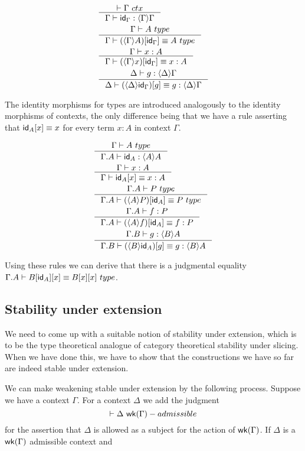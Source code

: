 \begin{align}
&\inference{\jctx{\Gamma}}{\jterm{\Gamma}{\ctxwk{\Gamma}{\Gamma}}{\idfunc[\Gamma]}}\label{ctxIdFuncForm}\\
&\inference{\jtype{\Gamma}{A}}{\jtypeeq{\Gamma}{\subst{\idfunc[\Gamma]}{\ctxwk{\Gamma}{A}}}{A}}\label{ctxIdFuncPbInvType}\\
&\inference{\jterm{\Gamma}{A}{x}}{\jtermeq{\Gamma}{A}{\subst{\idfunc[\Gamma]}{\ctxwk{\Gamma}{x}}}{x}}\label{ctxIdFuncPbInvTerm}\\
&\inference{\jterm{\Delta}{\ctxwk{\Delta}{\Gamma}}{g}}{\jtermeq{\Delta}{\ctxwk{\Delta}{\Gamma}}{\subst{g}{\ctxwk{\Delta}{\idfunc[\Gamma]}}}{g}}\label{ctxIdFuncSubstInvTerm}
\end{align}

The identity morphisms for types are introduced analogously to the identity
morphisms of contexts, the only difference being that we have a rule asserting
that $\subst{x}{\idfunc[A]}\jdeq x$ for every term $x:A$ in context $\Gamma$.

\begin{align}
& \inference{\jtype{\Gamma}{A}}{\jterm{\ctxext{\Gamma}{A}}{\ctxwk{A}{A}}{\idfunc[A]}}\\
& \inference{\jterm{\Gamma}{A}{x}}{\jtermeq{\Gamma}{A}{\subst{x}{\idfunc[A]}}{x}}\\
& \inference{\jtype{\ctxext{\Gamma}{A}}{P}}{\jtypeeq{\ctxext{\Gamma}{A}}{\subst{\idfunc[A]}{\ctxwk{A}{P}}}{P}}\\
& \inference{\jterm{\ctxext{\Gamma}{A}}{P}{f}}{\jtermeq{\ctxext{\Gamma}{A}}{P}{\subst{\idfunc[A]}{\ctxwk{A}{f}}}{f}} \\
& \inference{\jterm{\ctxext{\Gamma}{B}}{\ctxwk{B}{A}}{g}}{\jtermeq{\ctxext{\Gamma}{B}}{\ctxwk{B}{A}}{\subst{g}{\ctxwk{B}{\idfunc[A]}}}{g}}
\end{align}

Using these rules we can derive that there is a judgmental equality $\jtypeeq{\ctxext{\Gamma}{A}}{\subst{x}{{\idfunc[A]}{B}}}
{\subst{x}{{x}{B}}}$.

\subsection{Stability under extension}
We need to come up with a suitable notion of stability under extension, which
is to be the type theoretical analogue of category theoretical stability under
slicing. When we have done this, we have to show that the constructions we have
so far are indeed stable under extension.

We can make weakening stable under extension by the following
process. Suppose we have a context $\Gamma$. For a context $\Delta$ we add the
judgment
\begin{equation*}
\vdash \Delta~\mathsf{wk}(\Gamma)-admissible
\end{equation*}
for the assertion that $\Delta$ is allowed as a subject for the action of
$\mathsf{wk}(\Gamma)$. If $\Delta$ is a $\mathsf{wk}(\Gamma)$ admissible context and
